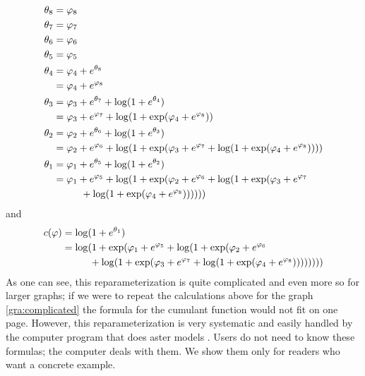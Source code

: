 \documentclass[11pt]{article}
\begin{document}
\begin{equation} \label{eq:big-phi-to-theta}
\begin{split}
   \theta_8 & = \varphi_8 \\
   \theta_7 & = \varphi_7 \\
   \theta_6 & = \varphi_6 \\
   \theta_5 & = \varphi_5 \\
   \theta_4 & = \varphi_4 + e^{\theta_8} \\
            & = \varphi_4 + e^{\varphi_8} \\
   \theta_3 & = \varphi_3 + e^{\theta_7} + \log(1 + e^{\theta_4}) \\
            & = \varphi_3 + e^{\varphi_7}
                + \log(1 + \exp(\varphi_4 + e^{\varphi_8})) \\
   \theta_2 & = \varphi_2 + e^{\theta_6} + \log(1 + e^{\theta_3}) \\
            & = \varphi_2 + e^{\varphi_6}
                + \log(1 + \exp(
            \varphi_3 + e^{\varphi_7}
                + \log(1 + \exp(\varphi_4 + e^{\varphi_8})))) \\
   \theta_1 & = \varphi_1 + e^{\theta_5} + \log(1 + e^{\theta_2}) \\
            & = \varphi_1 + e^{\varphi_5} + \log(1 + \exp(
            \varphi_2 + e^{\varphi_6}
                + \log(1 + \exp(
            \varphi_3 + e^{\varphi_7}
            \\
            & \hphantom{=} \qquad
                + \log(1 + \exp(\varphi_4 + e^{\varphi_8}))))))
\end{split}
\end{equation}
and
\begin{align*}
   c(\varphi)
   & =
   \log(1 + e^{\theta_1})
   \\
   & =
   \log(1 + \exp(
            \varphi_1 + e^{\varphi_5} + \log(1 + \exp(
            \varphi_2 + e^{\varphi_6}
            \\
            & \hphantom{=} \qquad
                + \log(1 + \exp(
            \varphi_3 + e^{\varphi_7}
                + \log(1 + \exp(\varphi_4 + e^{\varphi_8}))))))
   ))
\end{align*}
As one can see, this reparameterization is quite complicated
and even more so for
larger graphs; if we were to repeat the calculations above for the graph
\eqref{gra:complicated} the formula for the cumulant function would not
fit on one page.  However, this reparameterization is very systematic
and easily handled by the
computer program that does aster models
\citep{package}.  Users do not need to know these formulas; the computer
deals with them.  We show them only for readers who want a concrete example.
\end{document}

